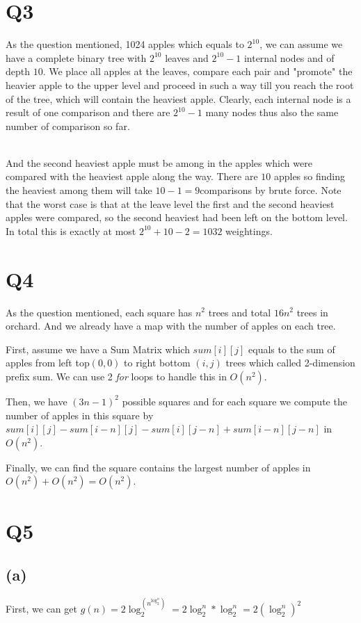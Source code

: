 \documentclass[a4paper]{article}
\begin{document}
	
	\section*{Q3}
	As the question mentioned, 1024 apples which equals to $2^{10}$, we can assume we have a complete binary tree with $2^{10}$ leaves and $2^{10} -1$ internal nodes and of depth $10$. We place all apples at the leaves, compare each pair and "promote" the heavier apple to the upper level and proceed in such a way till you reach the root of the tree, which will contain the heaviest apple. Clearly, each internal node is a result of one comparison and there are $2^{10} -1$ many nodes thus also the same number of comparison so far. 
	
	~\\	
	 And the second heaviest apple must be among in the apples which were compared with the heaviest apple along the way. There are $10$ apples so finding the heaviest among them will take $10-1=9$comparisons by brute force. Note that the worst case is that at the leave level the first and the second heaviest apples were compared, so the second heaviest had been left on the bottom level. In total this is exactly at most $2^{10} +10-2 = 1032$ weightings.
	\section*{Q4}
	As the question mentioned, each square has $n^2$ trees and total $16n^2$ trees in orchard. And we already have a map with the number of apples on each tree.
	
	First, assume we have a Sum Matrix which $sum[i][j]$ equals to  the sum of apples from left top$(0,0)$ to right bottom $(i,j)$ trees which called 2-dimension prefix sum. We can use 2 \textit{for} loops to handle this in $O(n^2)$.
	
	Then, we have $(3n -1)^2$ possible squares and for each square we compute the number of apples in this square by $sum[i][j] - sum[i-n][j] - sum[i][j-n] + sum[i-n][j-n]$ in $O(n^2)$. 
	
	Finally, we can find the square contains the largest number of apples in $O(n^2) + O(n^2) = O(n^2)$.
	
	\section*{Q5}
	\subsection*{(a)}
	First, we can get $g(n) = 2\log_2^{(n^{\log_2^n})} = 2\log_2^n * \log_2^n = 2(\log_2^n)^2$
	
\end{document}
